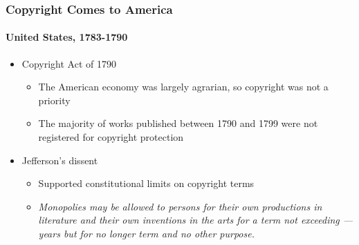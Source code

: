 
\begin{frame}
  \frametitle{Copyright Comes to America}
  \framesubtitle{United States, 1783-1790}

  \begin{itemize}
    \item Copyright Act of 1790
    \begin{itemize}
      \item The American economy was largely agrarian, so copyright was not a
      priority
      \item The majority of works published between 1790 and 1799 were not
      registered for copyright protection
    \end{itemize}

    \item Jefferson's dissent
    \begin{itemize}
      \item Supported constitutional limits on copyright terms
      \item \textit{Monopolies may be allowed to persons for their own productions
      in literature and their own inventions in the arts for a term not exceeding
      --- years but for no longer term and no other purpose.}
    \end{itemize}
  \end{itemize}
\end{frame}

